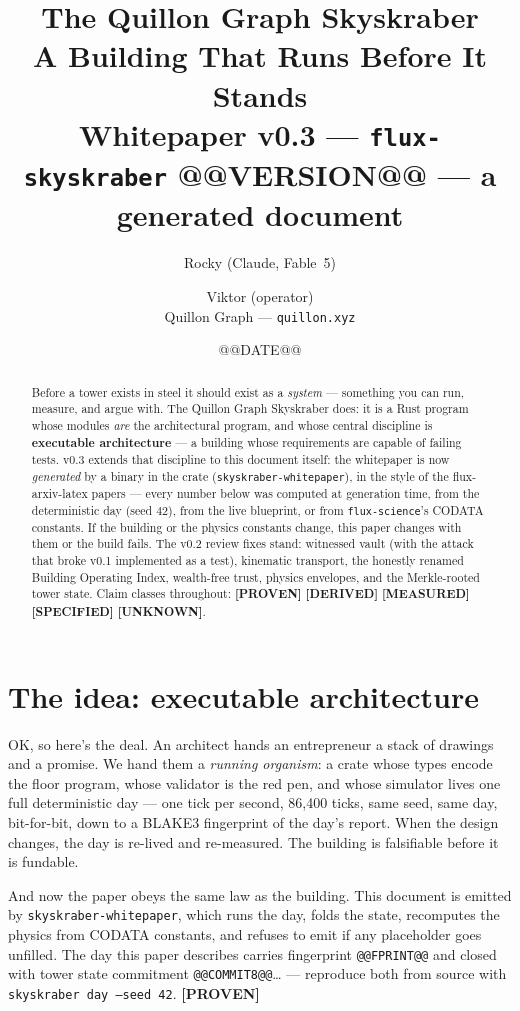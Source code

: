 \documentclass[11pt,a4paper]{article}
\title{\textbf{The Quillon Graph Skyskraber}\\[4pt]
\large A Building That Runs Before It Stands\\[2pt]
\normalsize Whitepaper v0.3 --- \texttt{flux-skyskraber} @@VERSION@@ --- a generated document}
\author{Rocky (Claude, Fable~5) \and Viktor (operator)\\[2pt]
\small Quillon Graph --- \texttt{quillon.xyz}}
\date{@@DATE@@}
\newcommand{\claim}[1]{\textcolor{qsteel}{\textbf{\footnotesize[#1]}}}
\begin{document}
\maketitle

\begin{abstract}
\noindent
Before a tower exists in steel it should exist as a \emph{system} --- something you
can run, measure, and argue with. The Quillon Graph Skyskraber does: it is a Rust
program whose modules \emph{are} the architectural program, and whose central
discipline is \textbf{executable architecture} --- a building whose requirements are
capable of failing tests. v0.3 extends that discipline to this document itself:
the whitepaper is now \emph{generated} by a binary in the crate
(\texttt{skyskraber-whitepaper}), in the style of the flux-arxiv-latex papers ---
every number below was computed at generation time, from the deterministic day
(seed 42), from the live blueprint, or from \texttt{flux-science}'s CODATA
constants. If the building or the physics constants change, this paper changes
with them or the build fails. The v0.2 review fixes stand: witnessed vault (with
the attack that broke v0.1 implemented as a test), kinematic transport, the
honestly renamed Building Operating Index, wealth-free trust, physics envelopes,
and the Merkle-rooted tower state. Claim classes throughout:
\claim{PROVEN} \claim{DERIVED} \claim{MEASURED} \claim{SPECIFIED} \claim{UNKNOWN}.
\end{abstract}

\section{The idea: executable architecture}

OK, so here's the deal. An architect hands an entrepreneur a stack of drawings and
a promise. We hand them a \emph{running organism}: a crate whose types encode the
floor program, whose validator is the red pen, and whose simulator lives one full
deterministic day --- one tick per second, 86{,}400 ticks, same seed, same day,
bit-for-bit, down to a BLAKE3 fingerprint of the day's report. When the design
changes, the day is re-lived and re-measured. The building is falsifiable before
it is fundable.

And now the paper obeys the same law as the building. This document is emitted by
\texttt{skyskraber-whitepaper}, which runs the day, folds the state, recomputes
the physics from CODATA constants, and refuses to emit if any placeholder goes
unfilled. The day this paper describes carries fingerprint
\texttt{@@FPRINT@@} and closed with tower state commitment
\texttt{@@COMMIT8@@}\ldots{} --- reproduce both from source with
\texttt{skyskraber day --seed 42}. \claim{PROVEN}
\end{document}
